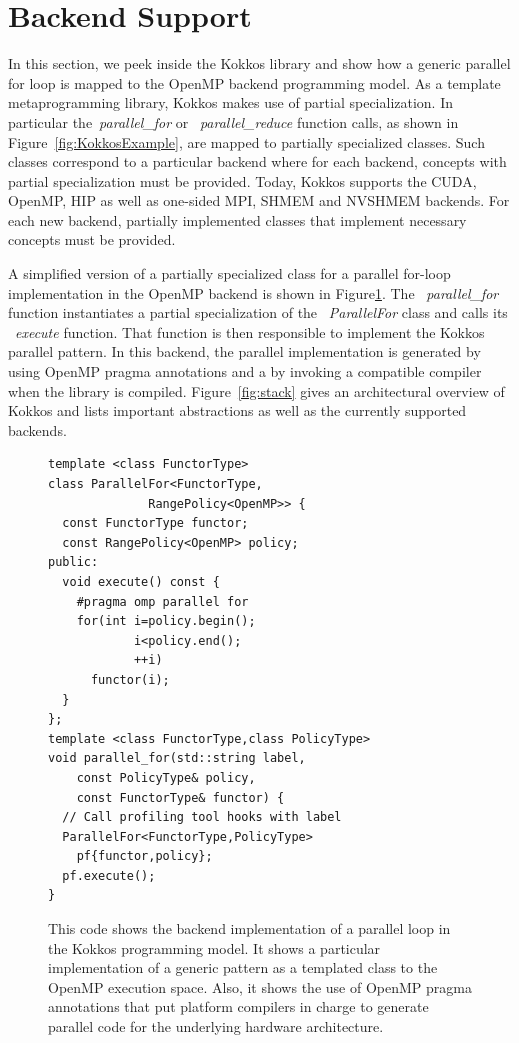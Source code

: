 
\section{Backend Support}\label{chap:backend}

In this section, we peek inside the Kokkos library and show how a generic parallel for loop is mapped to the OpenMP backend programming model. As a template metaprogramming library, Kokkos makes use of partial specialization. In particular the~\emph{parallel\_for} or ~\emph{parallel\_reduce} function calls, as shown in Figure~\ref{fig:KokkosExample}, are mapped to partially specialized classes. Such classes correspond to a particular backend where for each backend, concepts with partial specialization must be provided. Today, Kokkos supports the CUDA, OpenMP, HIP as well as one-sided MPI, SHMEM and NVSHMEM backends. For each new backend, partially implemented classes that implement necessary concepts must be provided.

A simplified version of a partially specialized class for a parallel for-loop implementation in the OpenMP backend is shown in Figure\ref{fig:KokkosExampleOMPBackEnd}. The ~\emph{parallel\_for} function instantiates a partial specialization of the ~\emph{ParallelFor} class and calls its ~\emph{execute} function. That function is then responsible to implement the Kokkos parallel pattern. In this backend, the parallel implementation is generated by using OpenMP pragma annotations and a by invoking a compatible compiler when the library is compiled. Figure~\ref{fig:stack} gives an architectural overview of Kokkos and lists important abstractions as well as the currently supported backends.
\begin{figure}
\begin{small}
\begin{verbatim}
template <class FunctorType>
class ParallelFor<FunctorType,
              RangePolicy<OpenMP>> {
  const FunctorType functor;
  const RangePolicy<OpenMP> policy; 
public:
  void execute() const {
    #pragma omp parallel for
    for(int i=policy.begin();
            i<policy.end();
            ++i)
      functor(i);
  }
};
template <class FunctorType,class PolicyType>
void parallel_for(std::string label, 
    const PolicyType& policy,
    const FunctorType& functor) {
  // Call profiling tool hooks with label
  ParallelFor<FunctorType,PolicyType> 
    pf{functor,policy};
  pf.execute();
}
\end{verbatim}
\end{small}
\caption{This code shows the backend implementation of a parallel loop in the Kokkos programming model. It shows a particular implementation of a generic pattern as a templated class to the OpenMP execution space. Also, it shows the use of OpenMP pragma annotations that put platform compilers in charge to generate parallel code for the underlying hardware architecture.}
\label{fig:KokkosExampleOMPBackEnd}
\end{figure}

